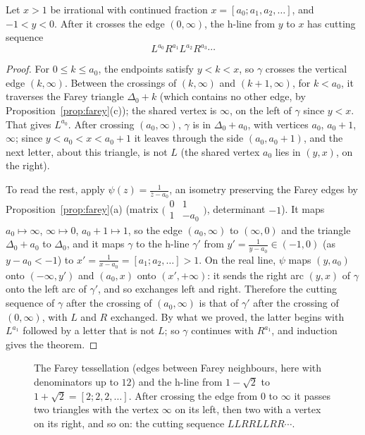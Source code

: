 \begin{theorem}[Series, 1985]\label{thm:cutting}
Let $x>1$ be irrational with continued fraction $x=[a_0;a_1,a_2,\dots]$, and $-1<y<0$. After it crosses the edge $(0,\infty)$, the h-line from $y$ to $x$ has cutting sequence
\[L^{a_0}R^{a_1}L^{a_2}R^{a_3}\cdots\]
\end{theorem}

\begin{proof}
For $0\le k\le a_0$, the endpoints satisfy $y<k<x$, so $\gamma$ crosses the vertical edge $(k,\infty)$. Between the crossings of $(k,\infty)$ and $(k+1,\infty)$, for $k<a_0$, it traverses the Farey triangle
$\Delta_0+k$ (which contains no other edge, by Proposition~\ref{prop:farey}(c)); the shared vertex is $\infty$, on the left of $\gamma$ since $y<x$. That gives $L^{a_0}$. After crossing $(a_0,\infty)$, $\gamma$ is in
$\Delta_0+a_0$, with vertices $a_0$, $a_0+1$, $\infty$; since $y<a_0<x<a_0+1$ it leaves through the side $(a_0,a_0+1)$, and the next letter, about this triangle, is not $L$ (the shared vertex $a_0$ lies
in $(y,x)$, on the right).

To read the rest, apply $\psi(z)=\frac1{\bar z-a_0}$, an isometry preserving the Farey edges by Proposition~\ref{prop:farey}(a) (matrix $\bigl(\begin{smallmatrix}0&1\\1&-a_0\end{smallmatrix}\bigr)$, determinant $-1$). It
maps $a_0\mapsto\infty$, $\infty\mapsto0$, $a_0+1\mapsto1$, so the edge $(a_0,\infty)$ to $(\infty,0)$ and the triangle $\Delta_0+a_0$ to $\Delta_0$, and it maps $\gamma$ to the h-line $\gamma'$ from
$y'=\frac1{y-a_0}\in(-1,0)$ (as $y-a_0<-1$) to $x'=\frac1{x-a_0}=[a_1;a_2,\dots]>1$. On the real line, $\psi$ maps $(y,a_0)$ onto $(-\infty,y')$ and $(a_0,x)$ onto $(x',+\infty)$: it sends the right arc $(y,x)$ of
$\gamma$ onto the left arc of $\gamma'$, and so exchanges left and right. Therefore the cutting sequence of $\gamma$ after the crossing of $(a_0,\infty)$ is that of $\gamma'$ after the crossing of $(0,\infty)$,
with $L$ and $R$ exchanged. By what we proved, the latter begins with $L^{a_1}$ followed by a letter that is not $L$; so $\gamma$ continues with $R^{a_1}$, and induction gives the theorem.
\end{proof}

\begin{figure}[ht]
\centering
{}
\caption{The Farey tessellation (edges between Farey neighbours, here with denominators up to $12$) and the h-line from $1-\sqrt2$ to $1+\sqrt2=[2;2,2,\dots]$. After crossing the edge from $0$ to $\infty$ it
passes two triangles with the vertex $\infty$ on its left, then two with a vertex on its right, and so on: the cutting sequence $LLRRLLRR\cdots$.}
\label{fig:farey}
\end{figure}

